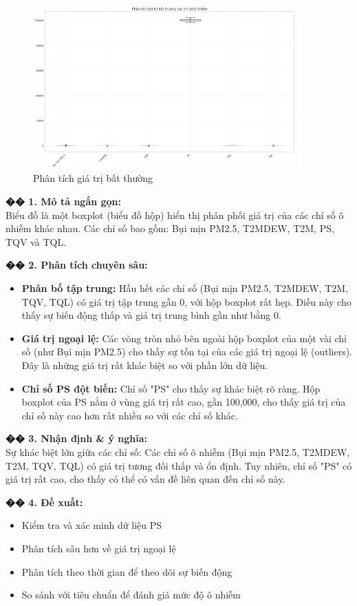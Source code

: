 \documentclass[12pt,a4paper]{article}
\begin{document}
\begin{figure}[H]
\centering
\includegraphics[width=0.9\textwidth]{results_comb_PM25_Hanoi_2018_sm_20251011_121424/20251011_121424_gia_tri_bat_thuong.png}
\caption{Phân tích giá trị bất thường}
\end{figure}

\begin{aibox}
\textbf{�� 1. Mô tả ngắn gọn:}\\
Biểu đồ là một boxplot (biểu đồ hộp) hiển thị phân phối giá trị của các chỉ số ô nhiễm khác nhau. Các chỉ số bao gồm: Bụi mịn PM2.5, T2MDEW, T2M, PS, TQV và TQL.

\textbf{�� 2. Phân tích chuyên sâu:}
\begin{itemize}
    \item \textbf{Phân bố tập trung:} Hầu hết các chỉ số (Bụi mịn PM2.5, T2MDEW, T2M, TQV, TQL) có giá trị tập trung gần 0, với hộp boxplot rất hẹp. Điều này cho thấy sự biến động thấp và giá trị trung bình gần như bằng 0.
    \item \textbf{Giá trị ngoại lệ:} Các vòng tròn nhỏ bên ngoài hộp boxplot của một vài chỉ số (như Bụi mịn PM2.5) cho thấy sự tồn tại của các giá trị ngoại lệ (outliers). Đây là những giá trị rất khác biệt so với phần lớn dữ liệu.
    \item \textbf{Chỉ số PS đột biến:} Chỉ số "PS" cho thấy sự khác biệt rõ ràng. Hộp boxplot của PS nằm ở vùng giá trị rất cao, gần 100,000, cho thấy giá trị của chỉ số này cao hơn rất nhiều so với các chỉ số khác.
\end{itemize}

\textbf{�� 3. Nhận định \& ý nghĩa:}\\
Sự khác biệt lớn giữa các chỉ số: Các chỉ số ô nhiễm (Bụi mịn PM2.5, T2MDEW, T2M, TQV, TQL) có giá trị tương đối thấp và ổn định. Tuy nhiên, chỉ số "PS" có giá trị rất cao, cho thấy có thể có vấn đề liên quan đến chỉ số này.

\textbf{�� 4. Đề xuất:}
\begin{itemize}
    \item Kiểm tra và xác minh dữ liệu PS
    \item Phân tích sâu hơn về giá trị ngoại lệ
    \item Phân tích theo thời gian để theo dõi sự biến động
    \item So sánh với tiêu chuẩn để đánh giá mức độ ô nhiễm
\end{itemize}
\end{aibox}
\end{document}
